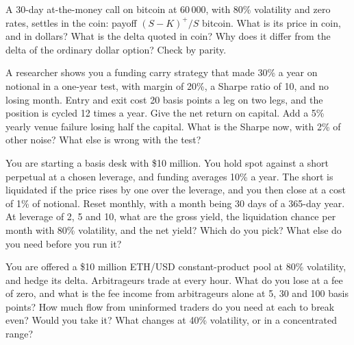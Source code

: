 \begin{question}\label{iq:iv2:crypto-for-traders-and-researchers:27}
A 30-day at-the-money call on bitcoin at 60\,000, with 80\% volatility and zero rates, settles in the coin: payoff $(S - K)^+/S$ bitcoin. What is its price in coin, and in dollars? What is the delta quoted in coin? Why does it differ from the delta of the ordinary dollar option? Check by parity.
\end{question}

\begin{question}\label{iq:iv2:crypto-for-traders-and-researchers:28}
A researcher shows you a funding carry strategy that made 30\% a year on notional in a one-year test, with margin of 20\%, a Sharpe ratio of 10, and no losing month. Entry and exit cost 20 basis points a leg on two legs, and the position is cycled 12 times a year. Give the net return on capital. Add a 5\% yearly venue failure losing half the capital. What is the Sharpe now, with 2\% of other noise? What else is wrong with the test?
\end{question}

\begin{question}\label{iq:iv2:crypto-for-traders-and-researchers:29}
You are starting a basis desk with \$10 million. You hold spot against a short perpetual at a chosen leverage, and funding averages 10\% a year. The short is liquidated if the price rises by one over the leverage, and you then close at a cost of 1\% of notional. Reset monthly, with a month being 30 days of a 365-day year. At leverage of 2, 5 and 10, what are the gross yield, the liquidation chance per month with 80\% volatility, and the net yield? Which do you pick? What else do you need before you run it?
\end{question}

\begin{question}\label{iq:iv2:crypto-for-traders-and-researchers:30}
You are offered a \$10 million ETH/USD constant-product pool at 80\% volatility, and hedge its delta. Arbitrageurs trade at every hour. What do you lose at a fee of zero, and what is the fee income from arbitrageurs alone at 5, 30 and 100 basis points? How much flow from uninformed traders do you need at each to break even? Would you take it? What changes at 40\% volatility, or in a concentrated range?
\end{question}

